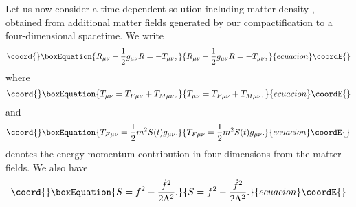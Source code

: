 \documentclass[a4paper,12pt]{article}
\begin{document}
Let us now consider a time-dependent solution
including matter density \coordHE{}, obtained from additional matter fields generated
by our compactification to a four-dimensional spacetime. We write
\begin{equation}\coord{}\boxEquation{
\label{4-Einstein}
R_{\mu\nu}-\frac{1}{2}g_{\mu\nu}R=-T_{\mu\nu},
}{
R_{\mu\nu}-\frac{1}{2}g_{\mu\nu}R=-T_{\mu\nu},
}{ecuacion}\coordE{}\end{equation}
where
\begin{equation}\coord{}\boxEquation{
T_{\mu\nu}=T_{F\mu\nu}+T_{M\mu\nu},
}{
T_{\mu\nu}=T_{F\mu\nu}+T_{M\mu\nu},
}{ecuacion}\coordE{}\end{equation}
and
\begin{equation}\coord{}\boxEquation{
T_{F\mu\nu}=\frac{1}{2}m^2S(t)g_{\mu\nu}.
}{
T_{F\mu\nu}=\frac{1}{2}m^2S(t)g_{\mu\nu}.
}{ecuacion}\coordE{}\end{equation}
\coordHE{} denotes the energy-momentum
contribution in four dimensions from the matter fields.
We also have
\begin{equation}\coord{}\boxEquation{
S=f^2-\frac{{\dot f}^2}{2\Lambda^2}.
}{
S=f^2-\frac{{\dot f}^2}{2\Lambda^2}.
}{ecuacion}\coordE{}\end{equation}
\end{document}
